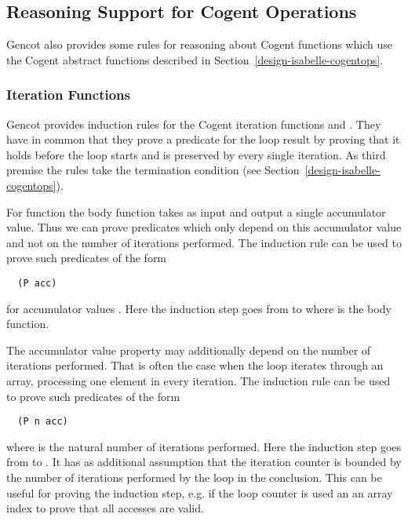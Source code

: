 \subsection{Reasoning Support for Cogent Operations}
\label{design-isabelle-cogentrul}

Gencot also provides some rules for reasoning about Cogent functions which use the Cogent abstract functions described in
Section~\ref{design-isabelle-cogentops}.

\subsubsection{Iteration Functions}

Gencot provides induction rules for the Cogent iteration functions  and . They have in common
that they prove a predicate for the loop result by proving that it holds before the loop starts and is preserved by every 
single iteration. As third premise the rules take the termination condition  (see 
Section~\ref{design-isabelle-cogentops}).

For function  the body function takes as input and output a single accumulator value. Thus we can prove
predicates which only depend on this accumulator value and not on the number of iterations performed. The induction rule
 can be used to prove such predicates of the form
\begin{verbatim}
  (P acc)
\end{verbatim}
for accumulator values . Here the induction step goes from  to  where  is
the body function.

The accumulator value property may additionally depend on the number of iterations performed. That is often the case when the loop 
iterates through an array, processing one element in every iteration. The induction rule  can be used
to prove such predicates of the form
\begin{verbatim}
  (P n acc)
\end{verbatim}
where  is the natural number of iterations performed. Here the induction step goes from  to 
. It has as additional assumption that the iteration counter  is bounded by the number
of iterations performed by the loop in the conclusion. This can be useful for proving the induction step, e.g. if the loop
counter is used an an array index to prove that all accesses are valid.

